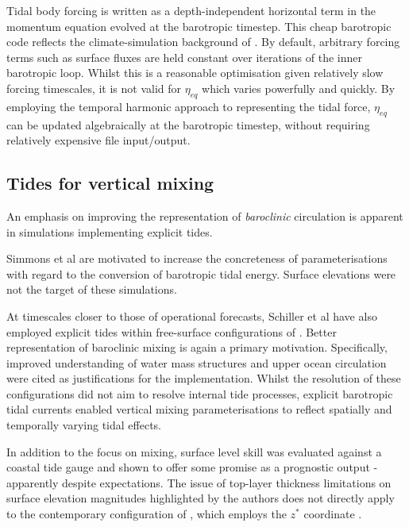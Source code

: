 Tidal body forcing is written as a depth-independent horizontal term in the momentum equation evolved at the barotropic timestep.
This cheap barotropic code reflects the climate-simulation background of \MOM{}.  
By default, arbitrary forcing terms such as surface fluxes are held constant over iterations of the inner barotropic loop.  
Whilst this is a reasonable optimisation given relatively slow forcing timescales, it is not valid for $\eta_{eq}$ which varies powerfully and quickly.
By employing the temporal harmonic approach to representing the tidal force, $\eta_{eq}$ can be updated algebraically at the barotropic timestep, without requiring relatively expensive file input/output.


\subsection{Tides for vertical mixing}

An emphasis on improving the representation of \emph{baroclinic} circulation is apparent in \OGCM{} simulations implementing explicit tides.

Simmons et al \citep{Simmons:2004fi} are motivated to increase the concreteness of parameterisations with regard to the conversion of barotropic tidal energy.  Surface elevations were not the target of these simulations. 


At timescales closer to those of operational forecasts, Schiller et al have also employed explicit tides within free-surface configurations of \MOM{}.  
Better representation of baroclinic mixing is again a primary motivation. 
Specifically, improved understanding of water mass structures \cite{Schiller:2004fv} and upper ocean circulation \cite{Schiller:2007gk} were cited as justifications for the implementation.  
Whilst the resolution of these configurations did not aim to resolve internal tide processes, explicit barotropic tidal currents enabled vertical mixing parameterisations to reflect spatially and temporally varying tidal effects.

In addition to the focus on mixing, surface level skill was evaluated against a coastal tide gauge and shown to offer some promise as a prognostic output \citep[Fig 2]{Schiller:2007gk} - apparently despite expectations.   
The issue of top-layer thickness limitations on surface elevation magnitudes highlighted by the authors does not directly apply to the contemporary \BL{} configuration of \MOM{}, which employs the $z^*$ coordinate \citep{Brassington:2012wm}.


